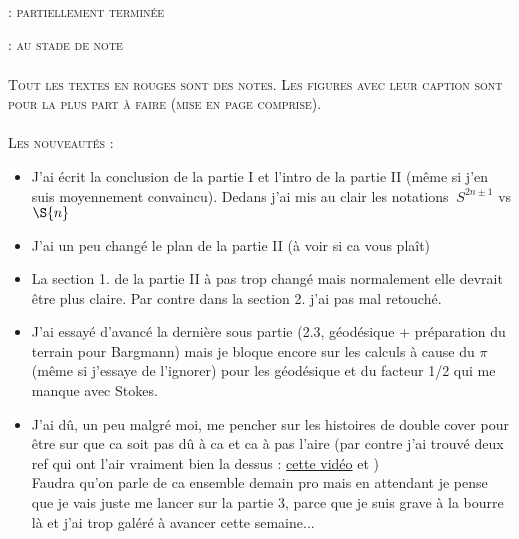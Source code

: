 \tableofcontents\thispagestyle{empty}

\skipl \\ \\ \\

\wip : \textsc{partiellement terminée}

\todo : \textsc{au stade de note}
\\ \\
\textsc{Tout les textes en rouges sont des notes. Les figures avec leur caption sont pour la plus part à faire (mise en page comprise).}
\\ \\
\textsc{Les nouveautés : }
\begin{itemize}
	\item J'ai écrit la conclusion de la partie I et l'intro de la partie II (même si j'en suis moyennement convaincu). Dedans j'ai mis au clair les notations $\ S^{2n\pm1}$ vs $\S{n}$
	
	\item J'ai un peu changé le plan de la partie II (à voir si ca vous plaît)
	
	\item La section 1. de la partie II à pas trop changé mais normalement elle devrait être plus claire. Par contre dans la section 2. j'ai pas mal retouché. 
	
	\item J'ai essayé d'avancé la dernière sous partie (2.3, géodésique + préparation du terrain pour Bargmann) mais je bloque encore sur les calculs à cause du $\pi$ (même si j'essaye de l'ignorer) pour les géodésique et du facteur 1/2 qui me manque avec Stokes.
	
	\item J'ai dû, un peu malgré moi, me pencher sur les histoires de double cover pour être sur que ca soit pas dû à ca et ca à pas l'aire (par contre j'ai trouvé deux ref qui ont l'air vraiment bien la dessus : \href{https://www.youtube.com/watch?v=Ay482u6b3Xo&t=959s}{cette vidéo} et \cite{woit_quantum_2017})
	\\
	Faudra qu'on parle de ca ensemble demain pro mais en attendant je pense que je vais juste me lancer sur la partie 3, parce que je suis grave à la bourre là et j'ai trop galéré à avancer cette semaine...
\end{itemize}


\newpage

\setcounter{page}{1}






